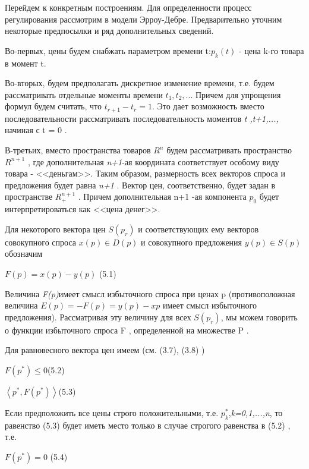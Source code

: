 \documentclass[12pt, 4paper]{book}
\begin{document}
{Перейдем к конкретным построениям. Для определенности процесс регулирования рассмотрим в модели Эрроу-Дебре. Предварительно уточним некоторые предпосылки и ряд дополнительных сведений.
\par

Во-первых, цены будем снабжать параметром времени t:$p_k(t)$ - цена k-го товара в момент t.
\par

Во-вторых, будем предполагать дискретное изменение времени, т.е. будем рассматривать отдельные моменты времени $t_1,t_2, ...$ Причем для упрощения формул будем считать, что $t_{r+1} - t_r = 1$. Это дает возможность вместо последовательности  рассматривать последовательность моментов \textit{t ,t+1,...,} начиная с t = 0 .
\par

В-третьих, вместо пространства товаров  $R^n$ будем рассматривать пространство $R^{n+1}$ , где дополнительная \textit{n+1}-ая координата соответствует особому виду товара - <<деньгам>>. Таким образом, размерность всех векторов спроса и предложения будет равна \textit{n+1} . Вектор цен, соответственно, будет задан в пространстве $R_{+}^{n+1}$ . Причем дополнительная n+1 -ая компонента $p_0$ будет интерпретироваться как <<цена денег>>.
\par

Для некоторого вектора цен $S(p_r)$ и соответствующих ему векторов совокупного спроса $x(p) \in D(p)$ и совокупного предложения $y(p) \in S(p)$ обозначим 
\begin{center}
$F(p) = x(p) - y(p)$ (5.1)
\end{center}
\par

Величина \textit{F(p)}имеет смысл избыточного спроса при ценах p (противоположная величина $E(p)=-F(p) = y(p)- x{p}$ имеет смысл избыточного предложения). Рассматривая эту величину для всех $S(p_r)$, мы можем говорить о функции избыточного спроса F , определенной на множестве P . 
\par

Для равновесного вектора цен имеем (см. (3.7), (3.8) )
\begin{center}
$F(p^{*}) \leq 0$(5.2)
\end{center}
\begin{center}
$\left\langle p^{*},F(p^{*})\right\rangle$(5.3)
\end{center}
\par

Если предположить все цены строго положительными, т.е. $p_{k}^{*}$,\textit{k=0,1,...,n}, то равенство (5.3) будет иметь место только в случае строгого равенства в (5.2) , т.е.
\begin{center}
$F(p^{*}) = 0$ (5.4)
\end{center}
\par

}
\end{document}

